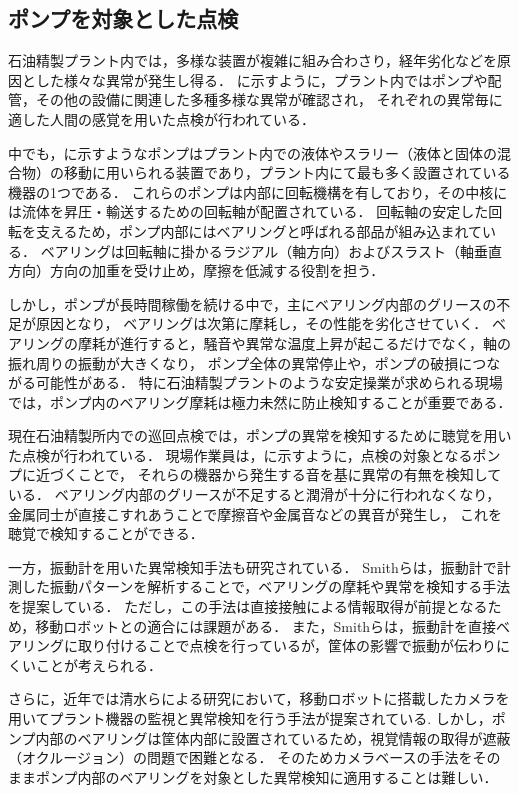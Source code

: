\documentclass[../main]{subfiles}
\begin{document}
\subsection{ポンプを対象とした点検}
\label{sec:intro_plant_characteristics}


石油精製プラント内では，多様な装置が複雑に組み合わさり，経年劣化などを原因とした様々な異常が発生し得る．
に示すように，プラント内ではポンプや配管，その他の設備に関連した多種多様な異常が確認され，
それぞれの異常毎に適した人間の感覚を用いた点検が行われている．


中でも，に示すようなポンプはプラント内での液体やスラリー（液体と固体の混合物）の移動に用いられる装置であり，プラント内にて最も多く設置されている機器の1つである．
これらのポンプは内部に回転機構を有しており，その中核には流体を昇圧・輸送するための回転軸が配置されている．
回転軸の安定した回転を支えるため，ポンプ内部にはベアリングと呼ばれる部品が組み込まれている．
ベアリングは回転軸に掛かるラジアル（軸方向）およびスラスト（軸垂直方向）方向の加重を受け止め，摩擦を低減する役割を担う．

しかし，ポンプが長時間稼働を続ける中で，主にベアリング内部のグリースの不足が原因となり，
ベアリングは次第に摩耗し，その性能を劣化させていく．
ベアリングの摩耗が進行すると，騒音や異常な温度上昇が起こるだけでなく，軸の振れ周りの振動が大きくなり，
ポンプ全体の異常停止や，ポンプの破損につながる可能性がある．
特に石油精製プラントのような安定操業が求められる現場では，ポンプ内のベアリング摩耗は極力未然に防止検知することが重要である．

現在石油精製所内での巡回点検では，ポンプの異常を検知するために聴覚を用いた点検が行われている．
現場作業員は，に示すように，点検の対象となるポンプに近づくことで，
それらの機器から発生する音を基に異常の有無を検知している．
ベアリング内部のグリースが不足すると潤滑が十分に行われなくなり，金属同士が直接こすれあうことで摩擦音や金属音などの異音が発生し，
これを聴覚で検知することができる．

一方，振動計を用いた異常検知手法も研究されている\cite{SMITH2015100}．
Smithらは，振動計で計測した振動パターンを解析することで，ベアリングの摩耗や異常を検知する手法を提案している．
ただし，この手法は直接接触による情報取得が前提となるため，移動ロボットとの適合には課題がある．
また，Smithらは，振動計を直接ベアリングに取り付けることで点検を行っているが，筐体の影響で振動が伝わりにくいことが考えられる．


さらに，近年では清水らによる研究において，移動ロボットに搭載したカメラを用いてプラント機器の監視と異常検知を行う手法が提案されている\cite{shimizu2024change}.
しかし，ポンプ内部のベアリングは筐体内部に設置されているため，視覚情報の取得が遮蔽（オクルージョン）の問題で困難となる．
そのためカメラベースの手法をそのままポンプ内部のベアリングを対象とした異常検知に適用することは難しい．
\end{document}
